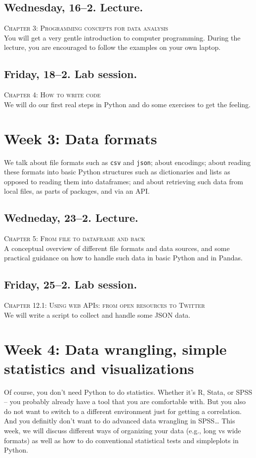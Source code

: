 \subsection*{Wednesday, 16--2. Lecture.}
\textsc{ Chapter 3: Programming concepts for data analysis}\\
You will get a very gentle introduction to computer programming. During the lecture, you are encouraged to follow the examples on your own laptop.


\subsection*{Friday, 18--2. Lab session.}
\textsc{ Chapter 4: How to write code}\\
We will do our first real steps in Python and do some exercises to get the feeling.


\section*{Week 3: Data formats}
We talk about file formats such as \texttt{csv} and \texttt{json}; about encodings; about reading these formats into basic Python structures such as dictionaries and lists as opposed to reading them into dataframes; and about retrieving such data from local files, as parts of packages, and via an API.

\subsection*{Wedneday, 23--2. Lecture.}
\textsc{ Chapter 5: From file to dataframe and back}\\
A conceptual overview of different file formats and data sources, and some practical guidance on how to handle such data in basic Python and in Pandas.


\subsection*{Friday, 25--2. Lab session.}
\textsc{ Chapter 12.1: Using web APIs: from open resources to Twitter}\\
We will write a script to collect and handle some JSON data.



\section*{Week 4: Data wrangling, simple statistics and visualizations}
Of course, you don't need Python to do statistics. Whether it's R, Stata, or SPSS -- you probably already have a tool that you are comfortable with. But you also do not want to switch to a different environment just for getting a correlation. And you definitly don't want to do advanced data wrangling in SPSS\ldots
This week, we will discuss different ways of organizing your data (e.g., long vs wide formats) as well as how to do conventional statistical tests and simpleplots in Python.


